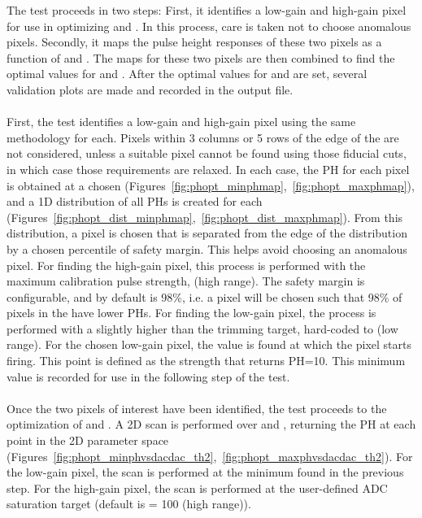 The \phopt test proceeds in two steps:  
First, it identifies a low-gain and high-gain pixel for use in optimizing \phscale and \phoffset.
In this process, care is taken not to choose anomalous pixels.
Secondly, it maps the pulse height responses of these two pixels as a function of \phscale and \phoffset.
The maps for these two pixels are then combined to find the optimal values for \phscale and \phoffset.
After the optimal values for \phscale and \phoffset are set, several validation plots are made and recorded in the output file.
\\\\
First, the test identifies a low-gain and high-gain pixel using the same methodology for each.
Pixels within 3 columns or 5 rows of the edge of the \roc are not considered, 
unless a suitable pixel cannot be found using those fiducial cuts, in which case those requirements are relaxed.
In each case, the PH for each pixel is obtained at a chosen \vcal (Figures~\ref{fig:phopt_minphmap},~\ref{fig:phopt_maxphmap}), 
and a 1D distribution of all PHs is created for each \roc (Figures~\ref{fig:phopt_dist_minphmap},~\ref{fig:phopt_dist_maxphmap}). 
From this distribution, a pixel is chosen that is separated from the edge of the distribution by a chosen percentile of safety margin.
This helps avoid choosing an anomalous pixel.
For finding the high-gain pixel, this process is performed with the maximum calibration pulse strength,  (high range).
The safety margin is configurable, and by default is 98\%, i.e. a pixel will be chosen such that 98\% of pixels in the \roc have lower PHs.
For finding the low-gain pixel, the process is performed with a \vcal slightly higher than the \vcal trimming target, 
hard-coded to  (low range).
For the chosen low-gain pixel, the \vcal value is found at which the pixel starts firing. 
This point is defined as the \vcal strength that returns PH=10.
This minimum \vcal value is recorded for use in the following step of the test.
\\\\
Once the two pixels of interest have been identified, the test proceeds to the optimization of \phscale and \phoffset.
A 2D scan is performed over \phscale and \phoffset, returning the PH at each point in the 2D parameter space
(Figures~\ref{fig:phopt_minphvsdacdac_th2},~\ref{fig:phopt_maxphvsdacdac_th2}).
For the low-gain pixel, the scan is performed at the minimum \vcal found in the previous step.
For the high-gain pixel, the scan is performed at the user-defined ADC saturation target (default is \vcal = 100 (high range)).
